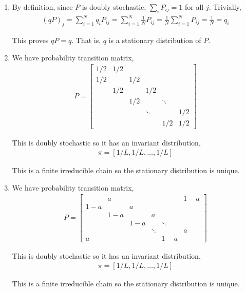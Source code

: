 \begin{solution}[Solution]
\begin{enumerate}[label=(\alph*)]
    \item By definition, since \( P \) is doubly stochastic, \( \sum_i P_{ij} = 1 \) for all \( j \). Trivially,
        \begin{align*}
            (qP)_j = \sum_{i=1}^N q_{i}P_{ij} = \sum_{i=1}^N \frac{1}{N} P_{ij} = \frac{1}{N}\sum_{i=1}^N P_{ij} = \frac{1}{N} = q_i
        \end{align*}

        This proves \( qP = q \). That is, \( q \) is a stationary distribution of \( P \).

    \item We have probability transition matrix,
        \begin{align*}
            P = \left[\begin{array}{cccccc}
                1/2 & 1/2 \\
                1/2 & &1/2 \\
                &1/2 & &1/2 \\
                &&1/2 &  &\ddots \\
                &&&\ddots &&1/2 \\ 
                &&&&1/2 & 1/2
            \end{array}\right]
        \end{align*}
       
        This is doubly stochastic so it has an invariant distribution,
        \begin{align*}
            \pi = [1/L,1/L,\ldots, 1/L]
        \end{align*}

        This is a finite irreducible chain so the stationary distribution is unique.

        
    \item We have probability transition matrix,
        \begin{align*}
            P = \left[\begin{array}{cccccc}
                & a &&&& 1-a \\
                1-a & & a \\
                &1-a & & a \\
                &&1-a &  &\ddots \\
                &&&\ddots &&a \\ 
                a &&&&1-a & 
            \end{array}\right]
        \end{align*}
       
        This is doubly stochastic so it has an invariant distribution,
        \begin{align*}
            \pi = [1/L,1/L,\ldots, 1/L]
        \end{align*}
        
        This is a finite irreducible chain so the stationary distribution is unique.

\end{enumerate}
\end{solution}


